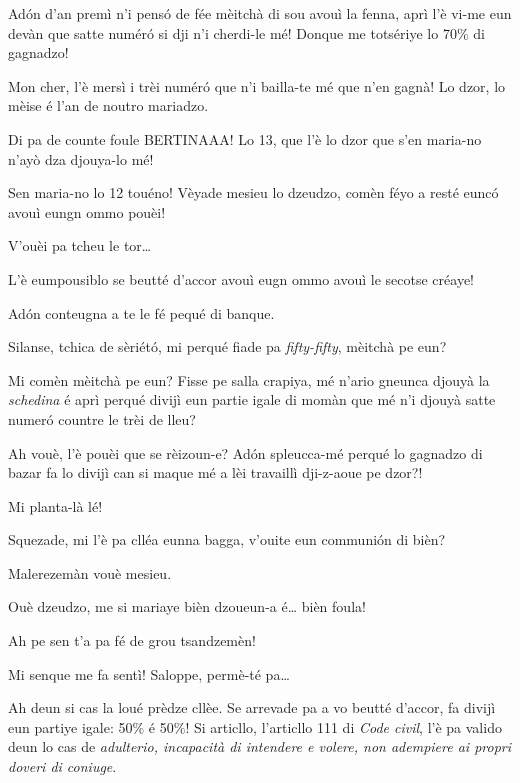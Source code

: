 \begin{drama}
\Tobiespeaks Adón d’an premì n’i pensó de fée mèitchà di sou avouì la fenna, aprì l’è vi-me eun devàn que satte numér\'o si dji n’i cherdi-le mé! Donque me totsériye lo 70$\%$ di gagnadzo!

\Bertinaspeaks Mon cher, l’è mersì i trèi numér\'o que n’i bailla-te mé que n’en gagnà! Lo dzor, lo mèise é l’an de noutro mariadzo.

\Tobiespeaks Di pa de counte foule BERTINAAA! Lo 13, que l’è lo dzor que s’en maria-no n’ayò dza djouya-lo mé!

\Bertinaspeaks Sen maria-no lo 12 touéno!  Vèyade mesieu lo dzeudzo, comèn féyo a resté eunc\'o avouì eungn ommo pouèi!

\DzeudzoSenliquerspeaks V'ouèi pa tcheu le tor\ldots

\Bertinaspeaks L’è eumpousiblo se beutté d’accor avouì eugn ommo avouì le secotse créaye!

\Tobiespeaks Adón conteugna a te le fé pequé di banque.

\DzeudzoSenliquerspeaks {} Silanse, tchica de sèriét\'o, mi perqué fiade pa \textit{fifty-fifty}, mèitchà pe eun?

\Tobiespeaks Mi comèn mèitchà pe eun? Fisse pe salla crapiya, mé n’ario gneun\-ca djouyà la \textit{schedina} é aprì perqué divijì eun partie igale di momàn que mé n'i djouyà satte numer\'o countre le trèi de lleu?

\Bertinaspeaks Ah vouè, l’è pouèi que se rèizoun-e? Ad\'on spleucca-mé perqué lo gagnadzo di bazar fa lo divijì can si maque mé a lèi travaillì dji-z-aoue pe dzor?!

\Tobiespeaks Mi planta-là lé!

\DzeudzoSenliquerspeaks {} Squezade, mi l’è pa cllé\-a eun\-na bagga, v'ouite eun communión di bièn?

\Tobiespeaks Malerezemàn vouè mesieu.

\Bertinaspeaks Ouè dzeudzo, me si mariaye bièn dzoueun-a é\ldots {} bièn foula!

\Tobiespeaks Ah pe sen t’a pa fé de grou tsandzemèn!

\Bertinaspeaks Mi senque me fa sentì! Saloppe, permè-té pa\ldots

\DzeudzoSenliquerspeaks {} Ah deun si cas la loué prèdze cllèe. Se arrevade pa a vo beutté d’accor, fa divijì eun partiye igale: 50$\%$ é 50$\%$! Si articllo, l’articllo 111 di \textit{Code civil}, l’è pa valido deun lo cas de  \og \textit{adulterio, incapacità di intendere e volere, non adempiere ai propri doveri di coniuge}\fg .


\end{drama}

